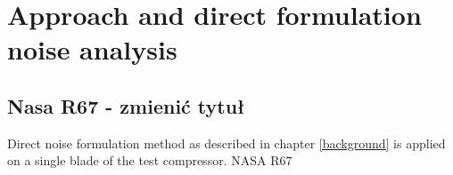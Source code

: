 
\chapter{Approach and direct formulation noise analysis} %

\label{approach} %



\section{Nasa R67 - zmienić tytuł}

Direct noise formulation method as described in chapter \ref{background} is applied on a single blade of the test compressor. NASA R67 





